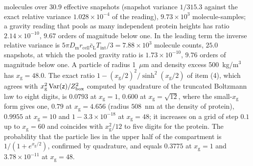 \begin{numcheck}
molecules over $30.9$ effective snapshots (snapshot variance $1/315.3$ against the exact relative variance $1.028\times10^{-4}$ of the reading), $9.73\times10^{3}$ molecule-samples; a gravity reading that pools as many independent protein heights has ratio $2.14\times10^{-10}$, $9.67$ orders of magnitude below one. In the leading term the inverse relative variance is $5\pi D_{\mathrm m}r_{\mathrm{cell}}\bar c_{\mathrm L}T_{\mathrm{int}}/3=7.88\times10^{3}$ molecule counts, $25.0$ snapshots, at which the pooled gravity ratio is $1.73\times10^{-10}$, $9.76$ orders of magnitude below one. A particle of radius 1~$\mu$m and density excess 500~kg/m$^3$ has $x_{\mathrm g}=48.0$. The exact ratio $1-(x_{\mathrm g}/2)^2/\sinh^2(x_{\mathrm g}/2)$ of item (4), which agrees with $x_{\mathrm g}^2\operatorname{Var}(\mathsf z)/Z_{\mathrm{box}}^2$ computed by quadrature of the truncated Boltzmann law to eight digits, is $0.0793$ at $x_{\mathrm g}=1$, $0.600$ at $x_{\mathrm g}=\sqrt{12}$, where the small-$x_{\mathrm g}$ form gives one, $0.79$ at $x_{\mathrm g}=4.656$ (radius $508$~nm at the density of protein), $0.9955$ at $x_{\mathrm g}=10$ and $1-3.3\times10^{-18}$ at $x_{\mathrm g}=48$; it increases on a grid of step $0.1$ up to $x_{\mathrm g}=60$ and coincides with $x_{\mathrm g}^2/12$ to five digits for the protein. The probability that the particle lies in the upper half of the compartment is $1/(1+e^{x_{\mathrm g}/2})$, confirmed by quadrature, and equals $0.3775$ at $x_{\mathrm g}=1$ and $3.78\times10^{-11}$ at $x_{\mathrm g}=48$.
\end{numcheck}

